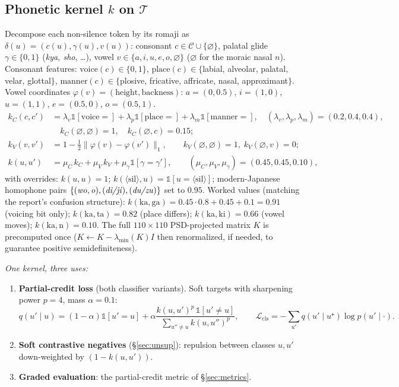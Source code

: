 \documentclass[10pt]{article}
\newcommand{\ind}[1]{\mathbb{1}\!\left[#1\right]}
\newcommand{\Tok}{\mathcal{T}}
\newcommand{\sil}{\langle\mathrm{sil}\rangle}
\begin{document}
\subsection{Phonetic kernel $k$ on $\Tok$}\label{sec:kernel}
Decompose each non-silence token by its romaji as $\delta(u) = (c(u), \gamma(u), v(u))$: consonant $c \in \mathcal{C} \cup \{\varnothing\}$, palatal glide $\gamma \in \{0,1\}$ (\emph{kya, sho}, \dots), vowel $v \in \{a,i,u,e,o,\varnothing\}$ ($\varnothing$ for the moraic nasal $n$). Consonant features: $\mathrm{voice}(c) \in \{0,1\}$, $\mathrm{place}(c) \in \{$labial, alveolar, palatal, velar, glottal$\}$, $\mathrm{manner}(c) \in \{$plosive, fricative, affricate, nasal, approximant$\}$. Vowel coordinates $\varphi(v) = (\text{height}, \text{backness})$: $a = (0, 0.5)$, $i = (1, 0)$, $u = (1, 1)$, $e = (0.5, 0)$, $o = (0.5, 1)$.
\begin{align}
k_C(c, c') &= \lambda_v \ind{\mathrm{voice} =} + \lambda_p \ind{\mathrm{place} =} + \lambda_m \ind{\mathrm{manner} =}, \quad (\lambda_v, \lambda_p, \lambda_m) = (0.2, 0.4, 0.4),\nonumber\\
&\quad k_C(\varnothing,\varnothing) = 1, \quad k_C(\varnothing, c) = 0.15;\\
k_V(v, v') &= 1 - \tfrac{1}{2}\lVert \varphi(v) - \varphi(v') \rVert_1, \qquad k_V(\varnothing,\varnothing) = 1,\; k_V(\varnothing, v) = 0;\\
k(u, u') &= \mu_C\, k_C + \mu_V\, k_V + \mu_\gamma \ind{\gamma = \gamma'}, \qquad (\mu_C, \mu_V, \mu_\gamma) = (0.45, 0.45, 0.10),
\end{align}
with overrides: $k(u,u) = 1$; $k(\sil, u) = \ind{u = \sil}$; modern-Japanese homophone pairs $\{(\text{\emph{wo}},\text{\emph{o}}), (\text{\emph{di/ji}}), (\text{\emph{du/zu}})\}$ set to $0.95$. Worked values (matching the report's confusion structure): $k(\text{ka},\text{ga}) = 0.45{\cdot}0.8 + 0.45 + 0.1 = 0.91$ (voicing bit only); $k(\text{ka},\text{ta}) = 0.82$ (place differs); $k(\text{ka},\text{ki}) = 0.66$ (vowel moves); $k(\text{ka},\text{n}) = 0.10$. The full $110{\times}110$ PSD-projected matrix $K$ is precomputed once ($K \leftarrow K - \lambda_{\min}(K) I$ then renormalized, if needed, to guarantee positive semidefiniteness).

\emph{One kernel, three uses:}
\begin{enumerate}
\item \textbf{Partial-credit loss} (both classifier variants). Soft targets with sharpening power $p = 4$, mass $\alpha = 0.1$:
\begin{equation}
q(u' \mid u) = (1-\alpha)\ind{u'=u} + \alpha \frac{k(u,u')^{p}\,\ind{u' \ne u}}{\sum_{u'' \ne u} k(u,u'')^{p}}, \qquad
\mathcal{L}_{\mathrm{cls}} = -\sum_{u'} q(u' \mid u^\star) \log p(u' \mid \cdot).
\end{equation}
\item \textbf{Soft contrastive negatives} (\S\ref{sec:unsup}): repulsion between classes $u, u'$ down-weighted by $(1 - k(u,u'))$.
\item \textbf{Graded evaluation}: the partial-credit metric of \S\ref{sec:metrics}.
\end{enumerate}
\end{document}
